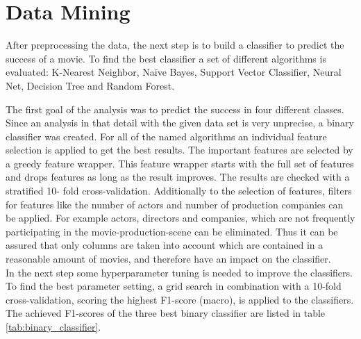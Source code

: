 \chapter{Data Mining}
\label{cha:data_mining}

After preprocessing the data, the next step is to build a classifier to predict the success of a movie. To find the best classifier a set of different algorithms is evaluated:
K-Nearest Neighbor, 
Na\"{i}ve Bayes, 
Support Vector Classifier, 
Neural Net, 
Decision Tree and 
Random Forest.

The first goal of the analysis was to predict the success in four different classes. Since an analysis in that detail with the given data set is very unprecise, a binary classifier was created.
For all of the named algorithms an individual feature selection is applied to get the best results. The important features are selected by a greedy feature wrapper. This feature wrapper starts with the full set of features and drops features as long as the result improves. The results are checked with a stratified 10- fold cross-validation. Additionally to the selection of features, filters for features like the number of actors and number of production companies can be applied. For example actors, directors and companies, which are not frequently participating in the movie-production-scene can be eliminated. Thus it can be assured that only columns are taken into account which are contained in a reasonable amount of movies, and therefore have an impact on the classifier. \\
In the next step some hyperparameter tuning is needed to improve the classifiers. To find the best parameter setting, a grid search in combination with a 10-fold cross-validation, scoring the highest F1-score (macro), is applied to the classifiers.
The achieved F1-scores of the three best binary classifier are listed in table \ref{tab:binary_classifier}. 

